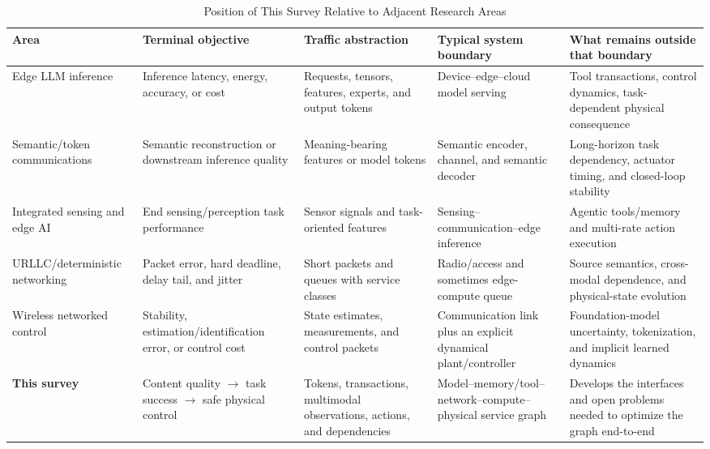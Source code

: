 \documentclass[letterpaper,journal]{IEEEtran}
\begin{document}
\begin{table}[t]
\caption{Position of This Survey Relative to Adjacent Research Areas}
\label{tab:positioning}
\centering
\footnotesize
\renewcommand{\arraystretch}{1.17}
\setlength{\tabcolsep}{3.1pt}
\begin{tabular}{|p{}|p{}|p{}|p{}|p{}|}
\hline
\textbf{Area} & \textbf{Terminal objective} & \textbf{Traffic abstraction}
& \textbf{Typical system boundary} & \textbf{What remains outside that
boundary} \\ \hline
Edge LLM inference &
Inference latency, energy, accuracy, or cost &
Requests, tensors, features, experts, and output tokens &
Device--edge--cloud model serving &
Tool transactions, control dynamics, task-dependent physical consequence
\\ \hline
Semantic/token communications &
Semantic reconstruction or downstream inference quality &
Meaning-bearing features or model tokens &
Semantic encoder, channel, and semantic decoder &
Long-horizon task dependency, actuator timing, and closed-loop stability
\\ \hline
Integrated sensing and edge AI &
End sensing/perception task performance &
Sensor signals and task-oriented features &
Sensing--communication--edge inference &
Agentic tools/memory and multi-rate action execution \\ \hline
URLLC/deterministic networking &
Packet error, hard deadline, delay tail, and jitter &
Short packets and queues with service classes &
Radio/access and sometimes edge-compute queue &
Source semantics, cross-modal dependence, and physical-state evolution
\\ \hline
Wireless networked control &
Stability, estimation/identification error, or control cost &
State estimates, measurements, and control packets &
Communication link plus an explicit dynamical plant/controller &
Foundation-model uncertainty, tokenization, and implicit learned dynamics
\\ \hline
\textbf{This survey} &
Content quality $\rightarrow$ task success $\rightarrow$ safe physical
control &
Tokens, transactions, multimodal observations, actions, and dependencies &
Model--memory/tool--network--compute--physical service graph &
Develops the interfaces and open problems needed to optimize the graph
end-to-end \\ \hline
\end{tabular}
\end{table}
\end{document}
